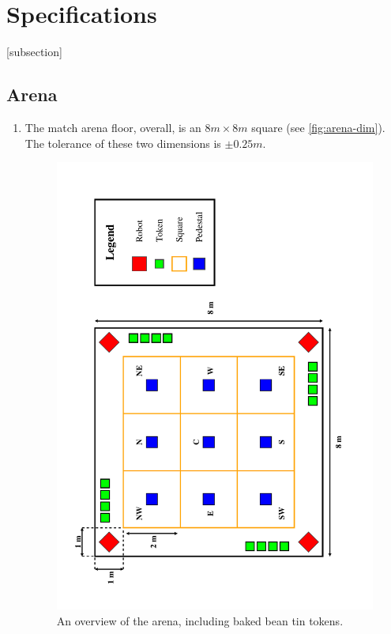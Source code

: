 \section{Specifications}
\label{sec:Specifications}

[subsection]
\newcommand{\rcnii}{\stepcounter{rulei}\arabic{section}.\arabic{subsection}.\arabic{rulei}}
\renewcommand{\labelenumi}{\rcnii}

\subsection{Arena}
\label{sub:arena}
\begin{enumerate}
\item The match arena floor, overall, is an $8m \times 8m$ square (see \autoref{fig:arena-dim}).
 The tolerance of these two dimensions is $\pm0.25m$.

\begin{figure}
  \includegraphics[keepaspectratio, clip, width=\textwidth]{./images/arena.pdf}
  \caption{\label{fig:arena-dim}An overview of the arena, including baked bean tin tokens.}
\end{figure}



\end{enumerate}
